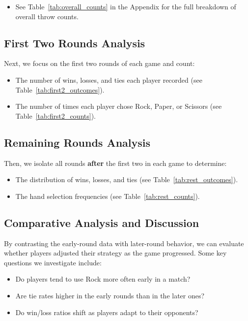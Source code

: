 \documentclass[12pt]{article}
\begin{document}
\begin{itemize}
    \item See Table~\ref{tab:overall_counts} in the Appendix for the full breakdown of overall throw counts.
\end{itemize}

\subsection*{First Two Rounds Analysis}
Next, we focus on the first two rounds of each game and count:

\begin{itemize}
    \item The number of wins, losses, and ties each player recorded (see Table~\ref{tab:first2_outcomes}).
    \item The number of times each player chose Rock, Paper, or Scissors (see Table~\ref{tab:first2_counts}).
\end{itemize}

\subsection*{Remaining Rounds Analysis}
Then, we isolate all rounds \textbf{after} the first two in each game to determine:

\begin{itemize}
    \item The distribution of wins, losses, and ties (see Table~\ref{tab:rest_outcomes}).
    \item The hand selection frequencies (see Table~\ref{tab:rest_counts}).
\end{itemize}

\subsection*{Comparative Analysis and Discussion}
By contrasting the early-round data with later-round behavior, we can evaluate whether players adjusted their strategy as the game progressed. Some key questions we investigate include:

\begin{itemize}
    \item Do players tend to use Rock more often early in a match?
    \item Are tie rates higher in the early rounds than in the later ones?
    \item Do win/loss ratios shift as players adapt to their opponents?
\end{itemize}
\end{document}
